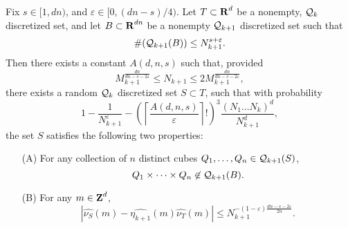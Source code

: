 \begin{lemma} \label{discreteFourierBuildingBlock}
    Fix $s \in [1,dn)$, and $\varepsilon \in [0,(dn-s)/4)$. Let $T \subset \operatorname{\mathbf{R}}^d$ be a nonempty, $\operatorname{\mathcal{Q}}_k$ discretized set, and let $B \subset \operatorname{\mathbf{R}}^{dn}$ be a nonempty $\operatorname{\mathcal{Q}}_{k+1}$ discretized set such that
    \begin{equation} \label{equation982589128942189}
        \#(\operatorname{\mathcal{Q}}_{k+1}(B)) \leq N_{k+1}^{s + \varepsilon}.
    \end{equation}
    Then there exists a constant $A(d,n,s)$ such that, provided
    \begin{equation} \label{equation5523786128439}
        M_{k+1}^{\frac{dn}{dn - s - 2\varepsilon}} \leq N_{k+1} \leq 2 M_{k+1}^{\frac{dn}{dn - s - 2\varepsilon}},
    \end{equation}
    there exists a random $\operatorname{\mathcal{Q}}_k$ discretized set $S \subset T$, such that with probability
    \[ 1 - \frac{1}{N_{k+1}^\varepsilon} - \left( \left\lceil \frac{A(d,n,s)}{\varepsilon} \right \rceil! \right)^3 \frac{(N_1 \dots N_k)^d}{N_{k+1}^d}, \]
    the set $S$ satisfies the following two properties:
    \begin{enumerate}
        \item[(A)] For any collection of $n$ distinct cubes $Q_1, \dots, Q_n \in \operatorname{\mathcal{Q}}_{k+1}(S)$,
        \[ Q_1 \times \dots \times Q_n \not \in \operatorname{\mathcal{Q}}_{k+1}(B). \]

        \item[(B)] For any $m \in \operatorname{\mathbf{Z}}^d$,
        \[ |\widehat{\nu_S}(m) - \widehat{\eta_{k+1}}(m) \widehat{\nu_T}(m)| \leq N_{k+1}^{-(1 - \varepsilon) \frac{dn - s - 2\varepsilon}{2n}}. \]
    \end{enumerate}
\end{lemma}
